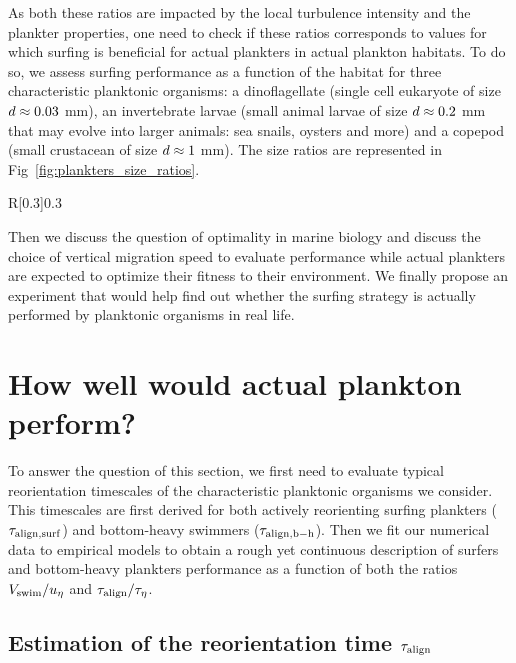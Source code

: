 As both these ratios are impacted by the local turbulence intensity and the plankter properties, one need to check if these ratios corresponds to values for which surfing is beneficial for actual plankters in actual plankton habitats.
To do so, we assess surfing performance as a function of the habitat for three characteristic planktonic organisms: a dinoflagellate (single cell eukaryote of size $d \approx 0.03$ mm), an invertebrate larvae (small animal larvae of size $d \approx 0.2$ mm that may evolve into larger animals: sea snails, oysters and more) and a copepod (small crustacean of size $d \approx 1$ mm).
The size ratios are represented in Fig~\ref{fig:plankters_size_ratios}.
\begin{wrapfigure}[13]{R}[0.3\width]{0.3\textwidth}
	\vspace{0pt}
	\centering
	\def\svgwidth{0.25\textwidth}
	
	\captionsetup{width=0.25\textwidth}
  	\caption{
  		Visual representation of the size ratios of the typical plankters we consider.
  	}
  	\label{fig:plankters_size_ratios}
\end{wrapfigure}
Then we discuss the question of optimality in marine biology and discuss the choice of vertical migration speed to evaluate performance while actual plankters are expected to optimize their fitness to their environment.
We finally propose an experiment that would help find out whether the surfing strategy is actually performed by planktonic organisms in real life.

\section{How well would actual plankton perform?}\label{sec:how_plankton_perform}

To answer the question of this section, we first need to evaluate typical reorientation timescales of the characteristic planktonic organisms we consider.
This timescales are first derived for both actively reorienting surfing plankters ($\tau_{\mathrm{align}, \mathrm{surf}}$) and bottom-heavy swimmers ($\tau_{\mathrm{align}, \mathrm{b-h}}$).
Then we fit our numerical data to empirical models to obtain a rough yet continuous description of surfers and bottom-heavy plankters performance as a function of both the ratios $V_{\mathrm{swim}}/u_{\eta}$ and $\tau_{\mathrm{align}}/\tau_{\eta}$.

\subsection{Estimation of the reorientation time $\tau_{\mathrm{align}}$}\label{sec:bio_time}

